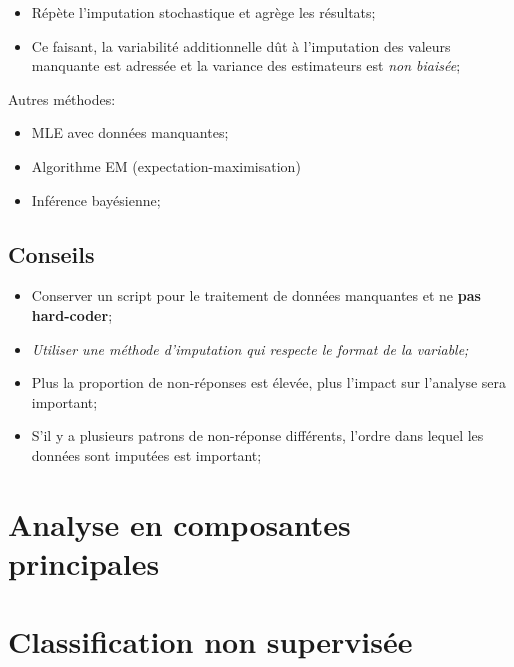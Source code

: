 \documentclass[10pt, french]{article}
\begin{document}
\begin{multicols*}{3}
\begin{enumerate}[leftmargin = *]
		\begin{itemize}[leftmargin = *]
		\item	Répète l'imputation stochastique et agrège les résultats;
		\item	Ce faisant, la variabilité additionnelle dût à l'imputation des valeurs manquante est adressée et la variance des estimateurs est \textit{non biaisée};
		\end{itemize}
\end{enumerate}

Autres méthodes:
\begin{itemize}[leftmargin = *]
	\item	MLE avec données manquantes;
	\item	Algorithme EM (expectation-maximisation)
	\item	Inférence bayésienne;
\end{itemize}

\subsection*{Conseils}
\begin{itemize}[leftmargin = *]
	\item	Conserver un script pour le traitement de données manquantes et ne \textbf{pas hard-coder};
	\item	\textit{Utiliser une méthode d'imputation qui respecte le format de la variable;}
	\item	Plus la proportion de non-réponses est élevée, plus l'impact sur l'analyse sera important;
	\item	S'il y a plusieurs patrons de non-réponse différents, l'ordre dans lequel les données sont imputées est important;
\end{itemize}

\newpage

\section{Analyse en composantes principales}

\newpage

\section{Classification non supervisée}


\end{multicols*}
\end{document}
